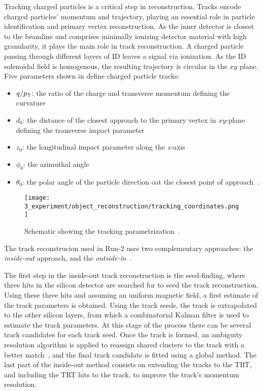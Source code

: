 Tracking charged particles is a critical step in reconstruction. Tracks encode charged particles' momentum and trajectory, playing an essential role in particle identification and primary vertex reconstruction. As the inner detector is closest to the beamline and comprises minimally ionizing detector material with high granularity, it plays the main role in track reconstruction. A charged particle passing through different layers of \ac{ID} leaves a signal via ionization. As the \ac{ID} solenoidal field is homogenous, the resulting trajectory is circular in the \(xy\) plane. Five parameters shown in \Fig{\ref{fig:objects:track_vtx:track_parameters}} define charged particle tracks:
\begin{itemize}
    \item \(q/p_{\text{T}}\): the ratio of the charge and transverse momentum defining the curvature
    \item \(d_0\): the distance of the closest approach to the primary vertex in \(xy\)-plane defining the transverse impact parameter
    \item \(z_0\): the longitudinal impact parameter along the \(z\)-axis
    \item \(\phi_0\): the azimuthal angle
    \item \(\theta_0\): the polar angle of the particle direction oat the closest point of approach~\cite{ATLAS-Tracks-Performance-Run2}.
\end{itemize}

\begin{figure}[ht!]
    \centering
    \texttt{[image: 3\_experiment/object\_reconstruction/tracking\_coordinates.png]}
    \caption{Schematic showing the tracking parametrization~\cite{ATLAS-Tracking-2007}.}
    \label{fig:objects:track_vtx:track_parameters}
\end{figure}

The track reconstrucion used in Run-2 uses two complementary approaches: the \textit{inside-out} approach, and the \textit{outside-in}~\cite{ATLAS-NEWT}. 

The first step in the inside-out track reconstruction is the seed-finding, where three hits in the silicon detector are searched for to seed the track reconstruction. Using these three hits and assuming an uniform magnetic field, a first estimate of the track parameters is obtained. Using the track seeds, the track is extrapolated to the other silicon layers, from which a combinatorial Kalman filter is used to estimate the track parameters. At this stage of the process there can be several track candidates for each track seed. Once the track is formed, an ambiguity resolution algorithm is applied to reassign shared clusters to the track with a better match~\cite{ATLAS-NNClustering}, and the final track candidate is fitted using a global \chisq method. The last part of the inside-out method consists on extending the tracks to the \ac{TRT}, and including the \ac{TRT} hits to the track, to improve the track's momentum resolution.

